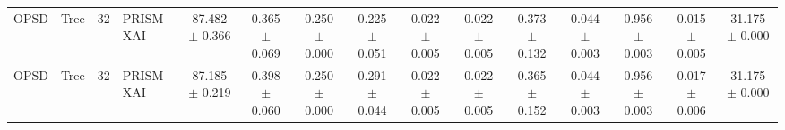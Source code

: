 \begin{table}[t]
\begin{tabular}{llllccccccccccc}
OPSD & Tree & 32 & PRISM-XAI & 87.482 $\pm$ 0.366 & 0.365 $\pm$ 0.069 & 0.250 $\pm$ 0.000 & 0.225 $\pm$ 0.051 & 0.022 $\pm$ 0.005 & 0.022 $\pm$ 0.005 & 0.373 $\pm$ 0.132 & 0.044 $\pm$ 0.003 & 0.956 $\pm$ 0.003 & 0.015 $\pm$ 0.005 & 31.175 $\pm$ 0.000 \\
OPSD & Tree & 32 & PRISM-XAI & 87.185 $\pm$ 0.219 & 0.398 $\pm$ 0.060 & 0.250 $\pm$ 0.000 & 0.291 $\pm$ 0.044 & 0.022 $\pm$ 0.005 & 0.022 $\pm$ 0.005 & 0.365 $\pm$ 0.152 & 0.044 $\pm$ 0.003 & 0.956 $\pm$ 0.003 & 0.017 $\pm$ 0.006 & 31.175 $\pm$ 0.000 \\
\bottomrule
\end{tabular}
\end{table}
